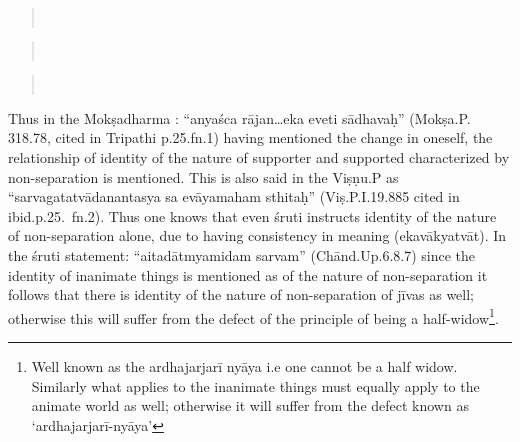 \begin{verse}
\\
\end{verse}
\begin{verse}
\\
\end{verse}
\begin{verse}
\\
\end{verse}

Thus in the Mokṣadharma : “anyaśca rājan…eka eveti sādhavaḥ” (Mokṣa.P. 318.78, cited in Tripathi p.25.fn.1)  having mentioned the change in oneself, the relationship of identity of the nature of supporter and supported characterized by non-separation is mentioned.  This is also said in the Viṣṇu.P as “sarvagatatvādanantasya sa evāyamaham sthitaḥ” (Viṣ.P.I.19.885 cited in ibid.p.25.~fn.2).   Thus one knows that even śruti instructs identity of the nature of non-separation alone, due to having consistency in meaning (ekavākyatvāt). In the śruti statement: “aitadātmyamidam sarvam” (Chānd.Up.6.8.7) since the identity of inanimate things is mentioned as of the nature of non-separation it follows that there is identity of the nature of non-separation of jīvas as well; otherwise this will suffer from the defect of the principle of being a half-widow\footnote{Well known as the ardhajarjarī nyāya i.e one cannot be a half widow. Similarly what applies to the inanimate things must equally apply to the animate world as well; otherwise it will suffer from the defect known as ‘ardhajarjarī-nyāya’}. 

